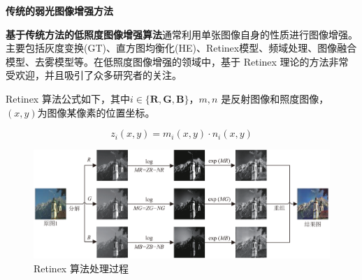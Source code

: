 \documentclass[CJK,aspectratio=169]{beamer}  %
\begin{document}
	\begin{frame}
		{ \yahei \textbf{传统的弱光图像增强方法}}
		
		{ \yahei \textbf{基于传统方法的低照度图像增强算法}通常利用单张图像自身的性质进行图像增强。主要包括灰度变换(GT)\textcolor{blue}{\citep{ueng1995gamma}}、直方图均衡化(HE)\textcolor{blue}{\citep{stark2000adaptive}}、Retinex模型\textcolor{blue}{\citep{land1971lightness}}、频域处理\textcolor{blue}{\citep{liu2021benchmarking}}、图像融合模型\textcolor{blue}{\citep{dai2019fractional}}、去雾模型\textcolor{blue}{\citep{ma2019improved}}等。在低照度图像增强的领域中，基于 Retinex 理论的方法非常受欢迎，并且吸引了众多研究者的关注。}
		
		\vspace{0.2cm}
		
		{ \yahei  Retinex 算法公式如下，其中$i \in \{\mathbf{R, G, B}\}$，$m,n$ 是反射图像和照度图像，$(x,y)$为图像某像素的位置坐标。}
		
		{ \yahei $$z_i\left(x,y\right) = m_i\left(x,y\right) \cdot n_i\left(x,y\right)$$}
				
		\vspace{0.1cm}
		
		\begin{figure}
			\centering 
			\includegraphics[width=0.5\columnwidth]{picture/LLIE/Retinex Model/Retinex Model}
			\caption{
				\label{fig: Retinex model} 
				\tiny Retinex 算法处理过程
			}
		\end{figure}
	\end{frame}
	
\end{document}
